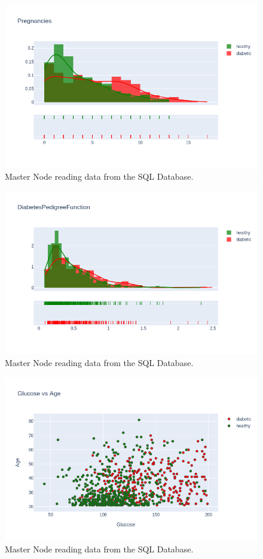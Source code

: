 \documentclass[12pt]{article}
\begin{document}
\begin{figure}[ht]
\centering
\includegraphics[width=1\textwidth]{newplot(10).png}
\caption{Master Node reading data from the SQL Database.}
\end{figure}

\begin{figure}[ht]
\centering
\includegraphics[width=1\textwidth]{newplot(11).png}
\caption{Master Node reading data from the SQL Database.}
\end{figure}

\begin{figure}[ht]
\centering
\includegraphics[width=1\textwidth]{newplot(12).png}
\caption{Master Node reading data from the SQL Database.}
\end{figure}
\end{document}
